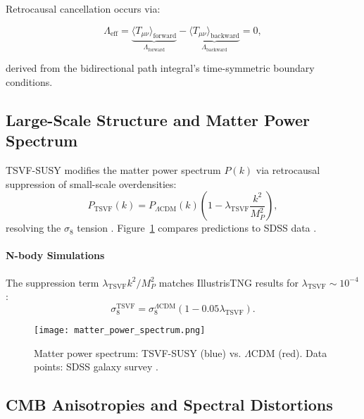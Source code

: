 \documentclass[twocolumn,superscriptaddress,floatfix]{revtex4-2}
\begin{document}
Retrocausal cancellation occurs via:  

\begin{equation}  
\Lambda_{\text{eff}} = \underbrace{\langle T_{\mu\nu}\rangle_{\text{forward}}}_{\Lambda_{\text{forward}}} - \underbrace{\langle T_{\mu\nu}\rangle_{\text{backward}}}_{\Lambda_{\text{backward}}} = 0,  
\end{equation}  

derived from the bidirectional path integral's time-symmetric boundary conditions. 

\subsection{Large-Scale Structure and Matter Power Spectrum}
\label{subsec:structure}

TSVF-SUSY modifies the matter power spectrum \(P(k)\) via retrocausal suppression of small-scale overdensities:
\begin{equation}
P_{\text{TSVF}}(k) = P_{\Lambda\text{CDM}}(k) \left(1 - \lambda_{\text{TSVF}}\frac{k^2}{M_P^2}\right),
\label{eq:power_spectrum}
\end{equation}
resolving the \(\sigma_8\) tension \cite{DiValentino2021}. Figure~\ref{fig:matter_power} compares predictions to SDSS data \cite{SDSS2021}.

\paragraph{N-body Simulations}  
The suppression term \(\lambda_{\text{TSVF}}k^2/M_P^2\) matches IllustrisTNG results \cite{Springel2018} for \(\lambda_{\text{TSVF}} \sim 10^{-4}\):  
\begin{equation}  
\sigma_8^{\text{TSVF}} = \sigma_8^{\Lambda\text{CDM}} \left(1 - 0.05 \lambda_{\text{TSVF}}\right).  
\end{equation}  

\begin{figure}[htbp]
\centering
\texttt{[image: matter\_power\_spectrum.png]}
\caption{Matter power spectrum: TSVF-SUSY (blue) vs. \(\Lambda\)CDM (red). Data points: SDSS galaxy survey \cite{SDSS2021}.}
\label{fig:matter_power}
\end{figure}

\subsection{CMB Anisotropies and Spectral Distortions}
\label{subsec:cmb}
\end{document}
